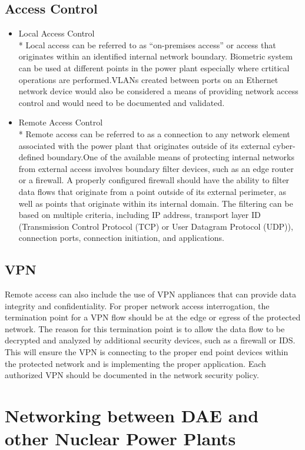 \documentclass{article}
\begin{document}
\subsection{Access Control}
\begin{itemize}
    \item {Local Access Control}
    \\* Local access can be referred to as “on-premises access” or access that originates within an
identified internal network boundary. Biometric system can be used at different points in the power plant especially where crtitical operations are performed.VLANs created
between ports on an Ethernet network device would also be considered a means of providing
network access control and would need to be documented and validated.
    \item{Remote Access Control}
    \\* Remote access can be referred to as a connection to any network element associated with the
power plant that originates outside of its external cyber-defined boundary.One of the available means of protecting internal networks from external access
involves boundary filter devices, such as an edge router or a firewall. A properly configured
firewall should have the ability to filter data flows that originate from a point outside of its
external perimeter, as well as points that originate within its internal domain. The filtering can be
based on multiple criteria, including IP address, transport layer ID (Transmission Control
Protocol (TCP) or User Datagram Protocol (UDP)), connection ports, connection initiation, and
applications.
\end{itemize}
\subsection{VPN}
Remote access can also include the use of VPN appliances that can provide data integrity and
confidentiality. For proper network access interrogation, the termination point for a VPN flow
should be at the edge or egress of the protected network. The reason for this termination point is
to allow the data flow to be decrypted and analyzed by additional security devices, such as a
firewall or IDS. This will ensure the VPN is connecting to the proper end point devices within
the protected network and is implementing the proper application. Each authorized VPN should
be documented in the network security policy.
\section{Networking between DAE and other Nuclear Power Plants}
\end{document}
